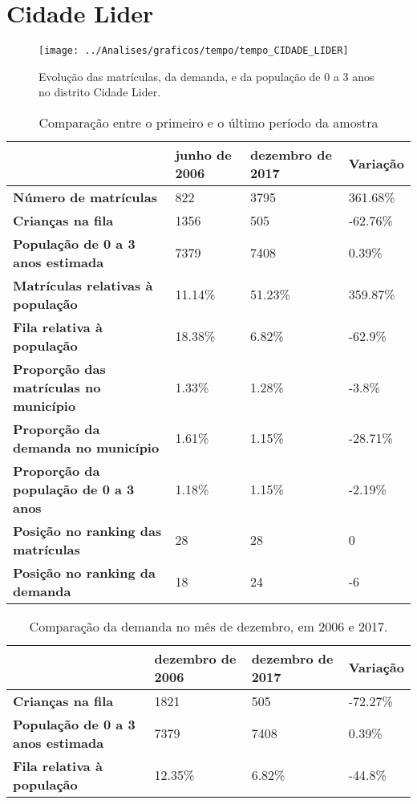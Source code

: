 \section{Cidade Lider}
\begin{figure}[H]
\centering
\texttt{[image: ../Analises/graficos/tempo/tempo\_CIDADE\_LIDER]}
\caption{Evolução das matrículas, da demanda, e da população de 0 a 3 anos no distrito Cidade Lider.}
\end{figure}
\begin{table}[H]
\begin{tabular}{|l|l|l|l|}
\hline
\textbf{}                                      & \textbf{junho de 2006}       & \textbf{dezembro de 2017}    & \textbf{Variação} \\ \hline
\textbf{Número de matrículas}                  & 822 & 3795 & 361.68\% \\ \hline
\textbf{Crianças na fila}                      & 1356 & 505 & -62.76\% \\ \hline
\textbf{População de 0 a 3 anos estimada}      & 7379 & 7408 & 0.39\% \\ \hline
\textbf{Matrículas relativas à população}      & 11.14\% & 51.23\% & 359.87\% \\ \hline
\textbf{Fila relativa à população}             & 18.38\% & 6.82\% & -62.9\% \\ \hline
\textbf{Proporção das matrículas no município} & 1.33\% & 1.28\% & -3.8\% \\ \hline
\textbf{Proporção da demanda no município}     & 1.61\% & 1.15\% & -28.71\% \\ \hline
\textbf{Proporção da população de 0 a 3 anos}  & 1.18\% & 1.15\% & -2.19\% \\ \hline
\textbf{Posição no ranking das matrículas}     & 28 & 28 & 0 \\ \hline
\textbf{Posição no ranking da demanda}         & 18 & 24 & -6 \\ \hline
\end{tabular}
\caption{Comparação entre o primeiro e o último período da amostra}
\end{table}
\begin{table}[H]
\begin{tabular}{|l|l|l|l|}
\hline
\textbf{}                                 & \textbf{dezembro de 2006} & \textbf{dezembro de 2017} & \textbf{Variação} \\ \hline
\textbf{Crianças na fila}                      & 1821 & 505 & -72.27\% \\ \hline
\textbf{População de 0 a 3 anos estimada}      & 7379 & 7408 & 0.39\% \\ \hline
\textbf{Fila relativa à população}             & 12.35\% & 6.82\% & -44.8\% \\ \hline
\end{tabular}
\caption{Comparação da demanda no mês de dezembro, em 2006 e 2017.}
\end{table}
